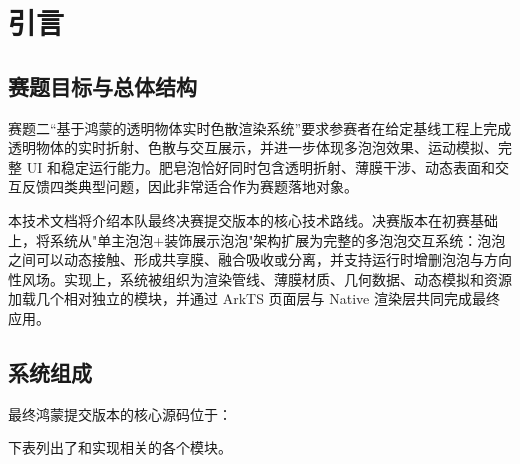 \chapter{引言}

\section{赛题目标与总体结构}

赛题二“基于鸿蒙的透明物体实时色散渲染系统”要求参赛者在给定基线工程上完成透明物体的实时折射、色散与交互展示，并进一步体现多泡泡效果、运动模拟、完整 UI 和稳定运行能力。肥皂泡恰好同时包含透明折射、薄膜干涉、动态表面和交互反馈四类典型问题，因此非常适合作为赛题落地对象。

本技术文档将介绍本队最终决赛提交版本的核心技术路线。决赛版本在初赛基础上，将系统从"单主泡泡+装饰展示泡泡"架构扩展为完整的多泡泡交互系统：泡泡之间可以动态接触、形成共享膜、融合吸收或分离，并支持运行时增删泡泡与方向性风场。实现上，系统被组织为渲染管线、薄膜材质、几何数据、动态模拟和资源加载几个相对独立的模块，并通过 ArkTS 页面层与 Native 渲染层共同完成最终应用。


\section{系统组成}

最终鸿蒙提交版本的核心源码位于：
\begin{quote}
\end{quote}
下表列出了和实现相关的各个模块。

